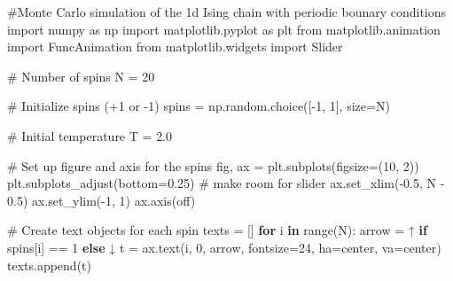 \documentclass[
  letterpaper,
  DIV=11,
  numbers=noendperiod]{scrreprt}
\newenvironment{Shaded}{\begin{snugshade}}{\end{snugshade}}
\newcommand{\BuiltInTok}[1]{\textcolor[rgb]{0.00,0.23,0.31}{#1}}
\newcommand{\CommentTok}[1]{\textcolor[rgb]{0.37,0.37,0.37}{#1}}
\newcommand{\ControlFlowTok}[1]{\textcolor[rgb]{0.00,0.23,0.31}{\textbf{#1}}}
\newcommand{\DecValTok}[1]{\textcolor[rgb]{0.68,0.00,0.00}{#1}}
\newcommand{\FloatTok}[1]{\textcolor[rgb]{0.68,0.00,0.00}{#1}}
\newcommand{\ImportTok}[1]{\textcolor[rgb]{0.00,0.46,0.62}{#1}}
\newcommand{\KeywordTok}[1]{\textcolor[rgb]{0.00,0.23,0.31}{\textbf{#1}}}
\newcommand{\NormalTok}[1]{\textcolor[rgb]{0.00,0.23,0.31}{#1}}
\newcommand{\OperatorTok}[1]{\textcolor[rgb]{0.37,0.37,0.37}{#1}}
\newcommand{\StringTok}[1]{\textcolor[rgb]{0.13,0.47,0.30}{#1}}
\begin{document}
\begin{Shaded}
\begin{Highlighting}[]
\CommentTok{\#Monte Carlo simulation of the 1d Ising chain with periodic bounary conditions}
\ImportTok{import}\NormalTok{ numpy }\ImportTok{as}\NormalTok{ np}
\ImportTok{import}\NormalTok{ matplotlib.pyplot }\ImportTok{as}\NormalTok{ plt}
\ImportTok{from}\NormalTok{ matplotlib.animation }\ImportTok{import}\NormalTok{ FuncAnimation}
\ImportTok{from}\NormalTok{ matplotlib.widgets }\ImportTok{import}\NormalTok{ Slider}

\CommentTok{\# Number of spins}
\NormalTok{N }\OperatorTok{=} \DecValTok{20} 

\CommentTok{\# Initialize spins (+1 or {-}1)}
\NormalTok{spins }\OperatorTok{=}\NormalTok{ np.random.choice([}\OperatorTok{{-}}\DecValTok{1}\NormalTok{, }\DecValTok{1}\NormalTok{], size}\OperatorTok{=}\NormalTok{N)}

\CommentTok{\# Initial temperature}
\NormalTok{T }\OperatorTok{=} \FloatTok{2.0}

\CommentTok{\# Set up figure and axis for the spins}
\NormalTok{fig, ax }\OperatorTok{=}\NormalTok{ plt.subplots(figsize}\OperatorTok{=}\NormalTok{(}\DecValTok{10}\NormalTok{, }\DecValTok{2}\NormalTok{))}
\NormalTok{plt.subplots\_adjust(bottom}\OperatorTok{=}\FloatTok{0.25}\NormalTok{)  }\CommentTok{\# make room for slider}
\NormalTok{ax.set\_xlim(}\OperatorTok{{-}}\FloatTok{0.5}\NormalTok{, N }\OperatorTok{{-}} \FloatTok{0.5}\NormalTok{)}
\NormalTok{ax.set\_ylim(}\OperatorTok{{-}}\DecValTok{1}\NormalTok{, }\DecValTok{1}\NormalTok{)}
\NormalTok{ax.axis(}\StringTok{\textquotesingle{}off\textquotesingle{}}\NormalTok{)}

\CommentTok{\# Create text objects for each spin}
\NormalTok{texts }\OperatorTok{=}\NormalTok{ []}
\ControlFlowTok{for}\NormalTok{ i }\KeywordTok{in} \BuiltInTok{range}\NormalTok{(N):}
\NormalTok{    arrow }\OperatorTok{=} \StringTok{\textquotesingle{}↑\textquotesingle{}} \ControlFlowTok{if}\NormalTok{ spins[i] }\OperatorTok{==} \DecValTok{1} \ControlFlowTok{else} \StringTok{\textquotesingle{}↓\textquotesingle{}}
\NormalTok{    t }\OperatorTok{=}\NormalTok{ ax.text(i, }\DecValTok{0}\NormalTok{, arrow, fontsize}\OperatorTok{=}\DecValTok{24}\NormalTok{, ha}\OperatorTok{=}\StringTok{\textquotesingle{}center\textquotesingle{}}\NormalTok{, va}\OperatorTok{=}\StringTok{\textquotesingle{}center\textquotesingle{}}\NormalTok{)}
\NormalTok{    texts.append(t)}


\end{Highlighting}
\end{Shaded}
\end{document}
